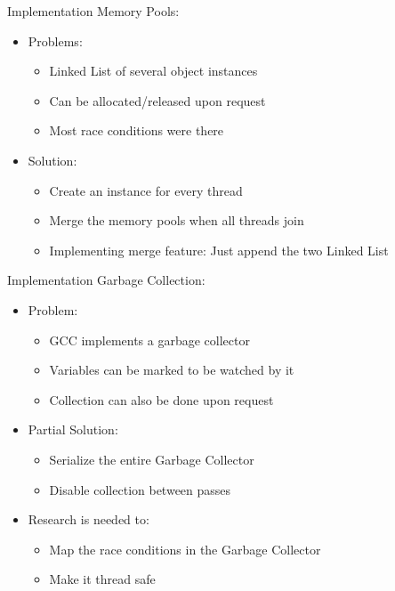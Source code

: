 \begin{frame}{Implementation}
    Memory Pools:
    \begin{itemize}
        \item Problems:
            \begin{itemize}
                \item Linked List of several object instances
                \item Can be allocated/released upon request
                \item Most race conditions were there
            \end{itemize}
        \item Solution:
            \begin{itemize}
                \item Create an instance for every thread
                \item Merge the memory pools when all threads join
                \item Implementing merge feature: Just append the two Linked List
            \end{itemize}
    \end{itemize}
\end{frame}

\begin{frame}{Implementation}
    Garbage Collection: 
    \begin{itemize}
        \item Problem: 
            \begin{itemize}
                \item GCC implements a garbage collector 
                \item Variables can be marked to be watched by it
                \item Collection can also be done upon request
            \end{itemize}
        \item Partial Solution:
            \begin{itemize}
                \item Serialize the entire Garbage Collector
                \item Disable collection between passes
            \end{itemize}
        \item Research is needed to:
            \begin{itemize}
                \item Map the race conditions in the Garbage Collector 
                \item Make it thread safe
            \end{itemize}
    \end{itemize}
\end{frame}

